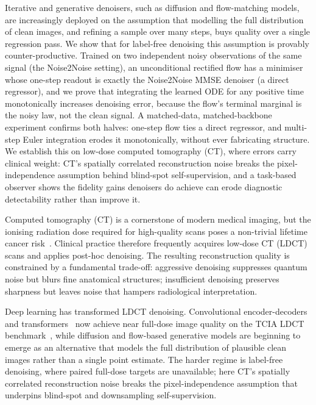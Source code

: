 \documentclass[letterpaper]{article} %
\begin{document}
Iterative and generative denoisers, such as diffusion and flow-matching models, are
increasingly deployed on the assumption that modelling the full distribution of
clean images, and refining a sample over many steps, buys quality over a single
regression pass.  We show that for label-free denoising this assumption is
provably counter-productive.  Trained on two independent noisy observations of the
same signal (the Noise2Noise setting), an unconditional rectified flow has
a minimiser whose one-step readout is exactly the Noise2Noise MMSE denoiser (a
direct regressor), and we prove that integrating the learned ODE for any positive
time monotonically increases denoising error, because the flow's terminal
marginal is the noisy law, not the clean signal.  A matched-data, matched-backbone
experiment confirms both halves: one-step flow ties a direct regressor, and
multi-step Euler integration erodes it monotonically, without ever fabricating
structure.  We establish this on low-dose computed tomography (CT), where errors
carry clinical weight: CT's spatially correlated reconstruction noise breaks the
pixel-independence assumption behind blind-spot self-supervision, and a task-based
observer shows the fidelity gains denoisers do achieve can erode diagnostic
detectability rather than improve it.

Computed tomography (CT) is a cornerstone of modern medical imaging, but
the ionising radiation dose required for high-quality scans poses a
non-trivial lifetime cancer risk~\cite{brenner2007computed}.  Clinical
practice therefore frequently acquires low-dose CT (LDCT) scans and
applies post-hoc denoising.  The resulting reconstruction quality is
constrained by a fundamental trade-off: aggressive denoising suppresses
quantum noise but blurs fine anatomical structures; insufficient
denoising preserves sharpness but leaves noise that hampers radiological
interpretation.

Deep learning has transformed LDCT denoising.  Convolutional
encoder-decoders~\cite{chen2017lowdose} and
transformers~\cite{wang2022ctformer} now achieve near full-dose image
quality on the TCIA LDCT benchmark~\cite{moen2021low}, while diffusion
and flow-based generative models are beginning to emerge as an
alternative that models the full distribution of plausible clean
images rather than a single point estimate.  The harder regime is
label-free denoising, where paired full-dose targets are
unavailable; here CT's spatially correlated reconstruction noise breaks the
pixel-independence assumption that underpins blind-spot and downsampling
self-supervision.
\end{document}
